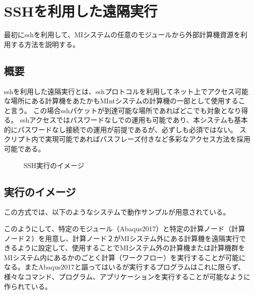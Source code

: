 \documentclass[letterpaper,10pt,dvipdfmx,openany]{sphinxmanual}
\begin{document}
\section{SSHを利用した遠隔実行}
\label{\detokenize{using_distributed_properties:ssh}}
最初にsshを利用して、MIシステムの任意のモジュールから外部計算機資源を利用する方法を説明する。


\subsection{概要}
\label{\detokenize{using_distributed_properties:id4}}
sshを利用した遠隔実行とは、sshプロトコルを利用してネット上でアクセス可能な場所にある計算機をあたかもMIntシステムの計算機の一部として使用すること言う。
この場合sshパケットが到達可能な場所であればどこでも対象となり得る。
sshアクセスではパスワードなしでの運用も可能であり、本システムも基本的にパスワードなし接続での運用が前提であるが、必ずしも必須ではない。
スクリプト内で実現可能であればパスフレーズ付きなど多彩なアクセス方法を採用可能である。

\begin{figure}[htbp]
\centering
\capstart
\caption{SSH実行のイメージ}\label{\detokenize{using_distributed_properties:id43}}\end{figure}


\subsection{実行のイメージ}
\label{\detokenize{using_distributed_properties:id5}}
この方式では、以下のようなシステムで動作サンプルが用意されている。

\begin{figure}[htbp]
\centering

\noindent{}
\end{figure}



このようにして、特定のモジュール（Abaqus2017）と特定の計算ノード（計算ノード２）を用意し、計算ノード２がMIシステム外にある計算機を遠隔実行できるように設定して、使用することでMIシステム外の計算機または計算機群をMIシステム内にあるかのごとく計算（ワークフロー）を実行することが可能になる。またAbaqus2017と謳ってはいるが実行するプログラムはこれに限らず、様々なコマンド、プログラム、アプリケーションを実行することが可能なように作られている。

\newpage
\end{document}
